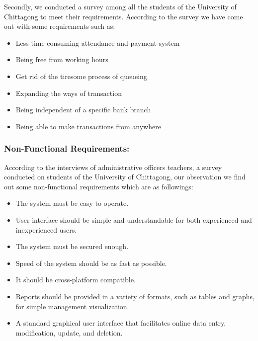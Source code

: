 Secondly, we conducted a survey among all the students of the University of Chittagong to meet their requirements. According to the survey we have come out with some requirements such as:
\begin{itemize}
	\item Less time-consuming attendance and payment system
	\item Being free from working hours 
	\item Get rid of the tiresome process of queueing
	\item Expanding the ways of transaction
	\item Being independent of a specific bank branch
	\item Being able to make transactions from anywhere
\end{itemize}

\subsubsection{Non-Functional Requirements:}\label{subsub:nonfunreq}
According to the interviews of administrative officers teachers, a survey conducted on students of the University of Chittagong, our observation we find out some non-functional requirements which are as followings:
\begin{itemize}
	\item The system must be easy to operate.
	\item User interface should be simple and understandable for both experienced and inexperienced users.
	\item The system must be secured enough.
	\item Speed of the system should be as fast as possible.
	\item It should be cross-platform compatible.
	\item Reports should be provided in a variety of formats, such as tables and graphs, for simple management visualization.
	\item A standard graphical user interface that facilitates online data entry, modification, update, and deletion.
\end{itemize}
